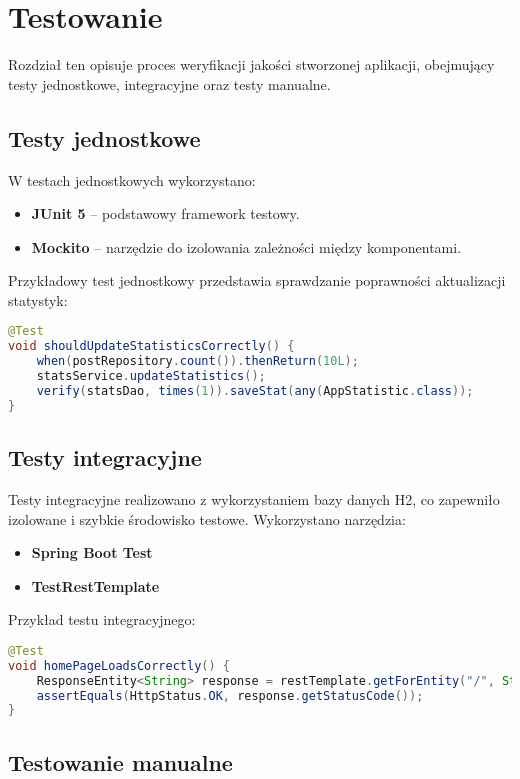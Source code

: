 \chapter{Testowanie}

Rozdział ten opisuje proces weryfikacji jakości stworzonej aplikacji, obejmujący testy jednostkowe, integracyjne oraz testy manualne.

\section{Testy jednostkowe}

W testach jednostkowych wykorzystano:

\begin{itemize}
    \item \textbf{JUnit 5} – podstawowy framework testowy.
    \item \textbf{Mockito} – narzędzie do izolowania zależności między komponentami.
\end{itemize}

Przykładowy test jednostkowy przedstawia sprawdzanie poprawności aktualizacji statystyk:

\begin{lstlisting}[language=Java]
@Test
void shouldUpdateStatisticsCorrectly() {
    when(postRepository.count()).thenReturn(10L);
    statsService.updateStatistics();
    verify(statsDao, times(1)).saveStat(any(AppStatistic.class));
}
\end{lstlisting}

\section{Testy integracyjne}

Testy integracyjne realizowano z wykorzystaniem bazy danych H2, co zapewniło izolowane i szybkie środowisko testowe. Wykorzystano narzędzia:

\begin{itemize}
    \item \textbf{Spring Boot Test}
    \item \textbf{TestRestTemplate}
\end{itemize}

Przykład testu integracyjnego:

\begin{lstlisting}[language=Java]
@Test
void homePageLoadsCorrectly() {
    ResponseEntity<String> response = restTemplate.getForEntity("/", String.class);
    assertEquals(HttpStatus.OK, response.getStatusCode());
}
\end{lstlisting}

\section{Testowanie manualne}
